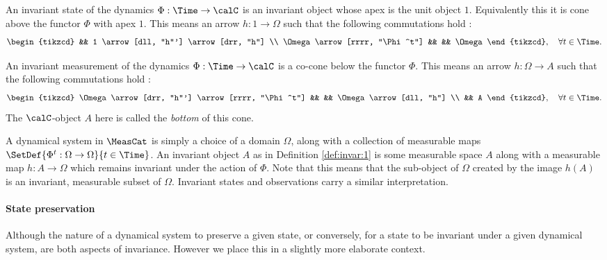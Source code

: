 \documentclass[12pt,oneside,pb-diagram]{article}
\begin{document}
\begin{definition}  \label{def:invar:2}
	An invariant state of the dynamics $\Phi : \Time \to \calC$ is an invariant object whose apex is the unit object $1$. Equivalently this it is cone above the functor $\Phi$ with apex $1$. This means an arrow $h:1\to \Omega$ such that the following commutations hold :
	\[%
	\begin{tikzcd}
		&& 1 \arrow[dll, "h"'] \arrow[drr, "h"] \\
		\Omega \arrow[rrrr, "\Phi^t"] && && \Omega
	\end{tikzcd} , \quad \forall t\in \Time.
	\]%
\end{definition}

\begin{definition}  \label{def:invar:3}
	An invariant measurement of the dynamics $\Phi : \Time \to \calC$ is a co-cone below the functor $\Phi$. This means an arrow $h:\Omega\to A$ such that the following commutations hold :
	\[%
	\begin{tikzcd}
		\Omega \arrow[drr, "h"'] \arrow[rrrr, "\Phi^t"] && && \Omega \arrow[dll, "h"] \\
		&& A
	\end{tikzcd} , \quad \forall t\in \Time.
	\]%
	The $\calC$-object $A$ here is called the \emph{bottom} of this cone.
\end{definition}

\begin{Erg}{}{} 
	A dynamical system in $\MeasCat$ is simply a choice of a domain $\Omega$, along with a collection of measurable maps $\SetDef{\Phi^t : \Omega \to \Omega}{t\in \Time}$. An invariant object $A$ as in Definition \ref{def:invar:1} is some measurable space $A$ along with a measurable map $h : A\to \Omega$ which remains invariant under the action of $\Phi$. Note that this means that the sub-object of $\Omega$ created by the image $h(A)$ is an invariant, measurable subset of $\Omega$. Invariant states and observations carry a similar interpretation.
\end{Erg}

\paragraph{State preservation} Although the nature of a dynamical system to preserve a given state, or conversely, for a state to be invariant under a given dynamical system, are both aspects of invariance. However we place this in a slightly more elaborate context.
\end{document}

